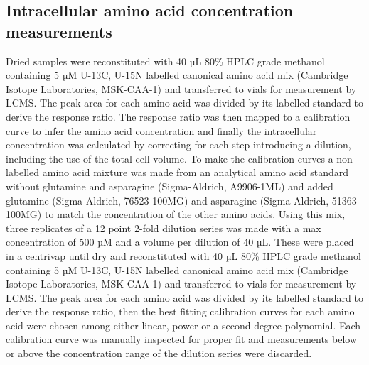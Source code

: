 \documentclass[9pt,lineno]{elife}
\begin{document}
\subsection{Intracellular amino acid concentration measurements}
Dried samples were reconstituted with 40 µL 80\% HPLC grade methanol containing 5 µM U-13C, U-15N labelled canonical amino acid mix (Cambridge Isotope Laboratories, MSK-CAA-1) and transferred to vials for measurement by LCMS.
The peak area for each amino acid was divided by its labelled standard to derive the response ratio.
The response ratio was then mapped to a calibration curve to infer the amino acid concentration and finally the intracellular concentration was calculated by correcting for each step introducing a dilution, including the use of the total cell volume.
To make the calibration curves a non-labelled amino acid mixture was made from an analytical amino acid standard without glutamine and asparagine (Sigma-Aldrich, A9906-1ML) and added glutamine (Sigma-Aldrich, 76523-100MG) and asparagine (Sigma-Aldrich, 51363-100MG) to match the concentration of the other amino acids.
Using this mix, three replicates of a 12 point 2-fold dilution series was made with a max concentration of 500 µM and a volume per dilution of 40 µL.
These were placed in a centrivap until dry and reconstituted with 40 µL 80\% HPLC grade methanol containing 5 µM U-13C, U-15N labelled canonical amino acid mix (Cambridge Isotope Laboratories, MSK-CAA-1) and transferred to vials for measurement by LCMS.
The peak area for each amino acid was divided by its labelled standard to derive the response ratio, then the best fitting calibration curves for each amino acid were chosen among either linear, power or a second-degree polynomial.
Each calibration curve was manually inspected for proper fit and measurements below or above the concentration range of the dilution series were discarded.
\end{document}
